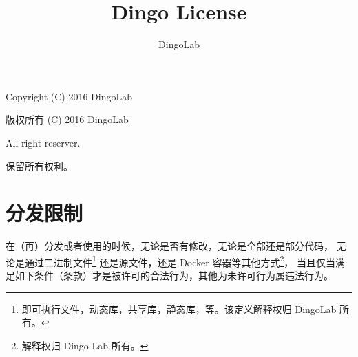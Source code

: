 








\makeatletter
\def\@NoStyleChaper{\ralex} %
\def\@LicenseDoc{\ralex} %
\def\@UsingAppendix{\ralex} %
\def\@DocType{article}
\def\@DocTypeCTEX{ctexart}
\makeatother


\doclass

\title{Dingo License}
\author{DingoLab}


  \maketitle

  \Huge{Copyright (C) 2016 DingoLab}
  \par
  \Huge{版权所有 (C) 2016 DingoLab}

  \par
  \Huge{All right reserver.}
  \par
  \Huge{保留所有权利。}

  \section{分发限制}
  在（再）分发或者使用的时候，无论是否有修改，无论是全部还是部分代码，
  无论是通过二进制文件\footnote{即可执行文件，动态库，共享库，静态库，等。该定义解释权归 DingoLab 所有。}
  还是源文件，还是 Docker 容器等其他方式\footnote{解释权归 Dingo Lab 所有。}，
  当且仅当满足如下条件（条款）才是被许可的合法行为，其他为未许可行为属违法行为。

